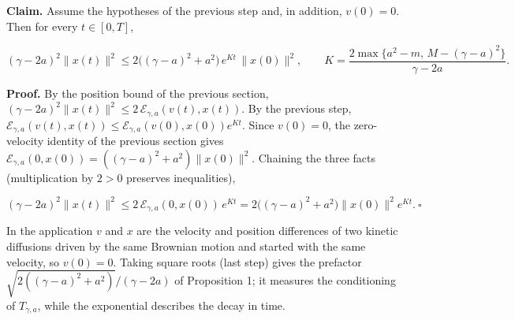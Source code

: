 \documentclass[11pt,a4paper]{article}
\begin{document}
\textbf{Claim.} Assume the hypotheses of the previous step and, in addition, \(v(0)=0\). Then for every \(t\in[0,T]\),


\[(\gamma-2a)^2\|x(t)\|^2\le2\bigl((\gamma-a)^2+a^2\bigr)\,e^{Kt}\,\|x(0)\|^2,\qquad K=\frac{2\max\{a^2-m,\,M-(\gamma-a)^2\}}{\gamma-2a}.\]


\textbf{Proof.} By the position bound of the previous section, \((\gamma-2a)^2\|x(t)\|^2\le2\,\mathcal E_{\gamma,a}(v(t),x(t))\). By the previous step, \(\mathcal E_{\gamma,a}(v(t),x(t))\le\mathcal E_{\gamma,a}(v(0),x(0))e^{Kt}\). Since \(v(0)=0\), the zero-velocity identity of the previous section gives \(\mathcal E_{\gamma,a}(0,x(0))=((\gamma-a)^2+a^2)\|x(0)\|^2\). Chaining the three facts (multiplication by \(2>0\) preserves inequalities),


\[(\gamma-2a)^2\|x(t)\|^2\le2\,\mathcal E_{\gamma,a}(0,x(0))\,e^{Kt}=2\bigl((\gamma-a)^2+a^2\bigr)\|x(0)\|^2e^{Kt}.\ \square\]


In the application \(v\) and \(x\) are the velocity and position differences of two kinetic diffusions driven by the same Brownian motion and started with the same velocity, so \(v(0)=0\). Taking square roots (last step) gives the prefactor \(\sqrt{2((\gamma-a)^2+a^2)}/(\gamma-2a)\) of Proposition 1; it measures the conditioning of \(T_{\gamma,a}\), while the exponential describes the decay in time.
\end{document}
